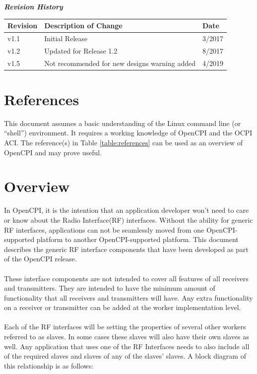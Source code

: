 	\begin{center}
	\textit{\textbf{Revision History}}
		\begin{table}[H]
		\label{table:revisions} %
      \begin{longtable}{|p{}
                        |p{}
                        |p{}|}
			\hline
			\rowcolor{blue}
			\textbf{Revision} & \textbf{Description of Change} & \textbf{Date} \\
		    \hline
		    v1.1 & Initial Release & 3/2017 \\
		    \hline
		    v1.2 & Updated for Release 1.2 & 8/2017 \\
		    \hline
        v1.5 & Not recommended for new designs warning added & 4/2019 \\
		    \hline
			\end{longtable}
		\end{table}
	\end{center}

\newpage

\tableofcontents

\newpage

\section{References}

	This document assumes a basic understanding of the Linux command line (or ``shell'') environment. It requires a working knowledge of OpenCPI and the OCPI ACI.  The reference(s) in Table \ref{table:references} can be used as an overview of OpenCPI and may prove useful.


\newpage
\section{Overview}
In OpenCPI, it is the intention that an application developer won't need to care or know about the Radio Interface(RF) interfaces.  Without the ability for generic RF interfaces, applications can not be seamlessly moved from one OpenCPI-supported platform to another OpenCPI-supported platform.  This document describes the generic RF interface components that have been developed as part of the OpenCPI release.  \\ \\
These interface components are not intended to cover all features of all receivers and transmitters.  They are intended to have the minimum amount of functionality that all receivers and transmitters will have.  Any extra functionality on a receiver or transmitter can be added at the worker implementation level. \\ \\
Each of the RF interfaces will be setting the properties of several other workers referred to as slaves.  In some cases these slaves will also have their own slaves as well.  Any application that uses one of the RF Interfaces needs to also include all of the required slaves and slaves of any of the slaves' slaves.  A block diagram of this relationship is as follows:

